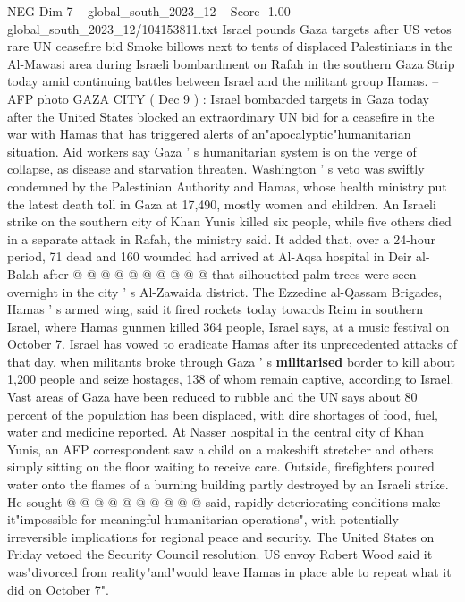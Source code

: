 \begin{textsample}{NEG Dim 7 – global\_south\_2023\_12 – Score -1.00 – global\_south\_2023\_12/104153811.txt}  \label{ex:f7_neg_191}
Israel pounds Gaza targets after US vetos rare UN ceasefire bid Smoke billows next to tents of displaced Palestinians in the Al-Mawasi area during Israeli bombardment on Rafah in the southern Gaza Strip today amid continuing battles between Israel and the militant group Hamas. -- AFP photo GAZA CITY ( Dec 9 ) : Israel bombarded targets in Gaza today after the United States blocked an extraordinary UN bid for a ceasefire in the war with Hamas that has triggered alerts of an"apocalyptic"humanitarian situation.
Aid workers say Gaza ' s humanitarian system is on the verge of collapse, as disease and starvation threaten.
Washington ' s veto was swiftly condemned by the Palestinian Authority and Hamas, whose health ministry put the latest death toll in Gaza at 17,490, mostly women and children.
An Israeli strike on the southern city of Khan Yunis killed six people, while five others died in a separate attack in Rafah, the ministry said.
It added that, over a 24-hour period, 71 dead and 160 wounded had arrived at Al-Aqsa hospital in Deir al-Balah after @ @ @ @ @ @ @ @ @ @ that silhouetted palm trees were seen overnight in the city ' s Al-Zawaida district.
The Ezzedine al-Qassam Brigades, Hamas ' s armed wing, said it fired rockets today towards Reim in southern Israel, where Hamas gunmen killed 364 people, Israel says, at a music festival on October 7.
Israel has vowed to eradicate Hamas after its unprecedented attacks of that day, when militants broke through Gaza ' s \textbf{militarised} border to kill about 1,200 people and seize hostages, 138 of whom remain captive, according to Israel.
Vast areas of Gaza have been reduced to rubble and the UN says about 80 percent of the population has been displaced, with dire shortages of food, fuel, water and medicine reported.
At Nasser hospital in the central city of Khan Yunis, an AFP correspondent saw a child on a makeshift stretcher and others simply sitting on the floor waiting to receive care.
Outside, firefighters poured water onto the flames of a burning building partly destroyed by an Israeli strike.
He sought @ @ @ @ @ @ @ @ @ @ said, rapidly deteriorating conditions make it"impossible for meaningful humanitarian operations", with potentially irreversible implications for regional peace and security.
The United States on Friday vetoed the Security Council resolution.
US envoy Robert Wood said it was"divorced from reality"and"would leave Hamas in place able to repeat what it did on October 7".

\end{textsample}
